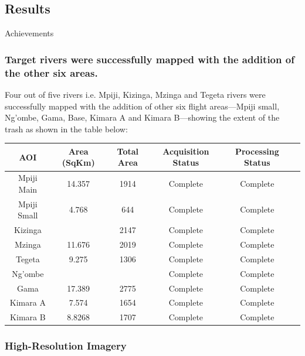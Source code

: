 \documentclass[a4paper,12pt,twoside]{article}
\begin{document}
\subsection{Results}
    Achievements

    \subsubsection{Target rivers were successfully mapped with the addition of the other six areas.}

        Four out of five rivers i.e. Mpiji, Kizinga, Mzinga and Tegeta rivers were successfully mapped with the addition of other six flight areas---Mpiji small, Ng'ombe, Gama, Base, Kimara A and Kimara B---showing the extent of the trash as shown in the table below:

        \begin{center}
          \begin{tabular}{|c|c|c|c|c|c|}  
            \hline
        	\bfseries AOI & \bfseries Area (SqKm) & \bfseries Total Area & \bfseries Acquisition Status & \bfseries Processing Status\\
        	\hline
            Mpiji Main & 14.357 & 1914 & Complete & Complete\\
            \hline
            Mpiji Small & 4.768 & 644 & Complete & Complete\\
            \hline
            Kizinga & & 2147 & Complete & Complete \\ %
            \hline
            Mzinga & 11.676 & 2019 & Complete & Complete \\
            \hline
            Tegeta & 9.275 & 1306 & Complete & Complete \\
            \hline
            Ng’ombe & & & Complete & Complete \\ %
            \hline
            Gama & 17.389 & 2775 & Complete & Complete \\
            \hline
            Kimara A & 7.574 & 1654 & Complete & Complete \\
            \hline
            Kimara B & 8.8268 & 1707 & Complete & Complete \\
            \hline
          
          \end{tabular}
        \end{center}
        
    \subsubsection{High-Resolution Imagery}
    
\end{document}

